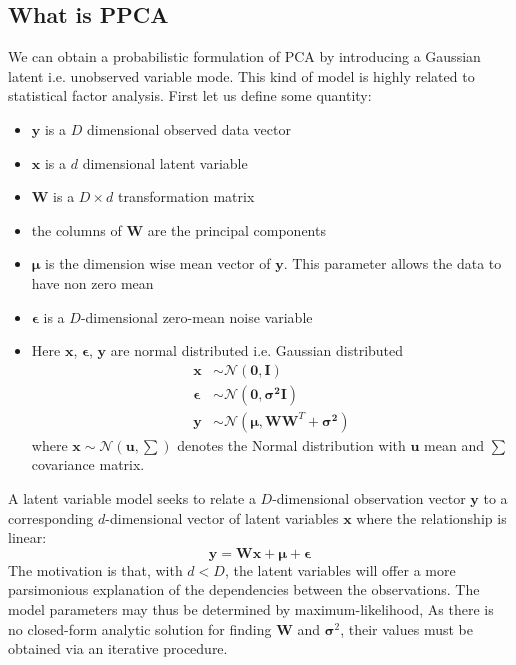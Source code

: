 \subsection{What is PPCA}
We can obtain a probabilistic formulation of PCA by introducing a Gaussian latent i.e. unobserved variable mode. This kind of model is highly related to statistical factor analysis. First let us define some quantity:
\begin{itemize}
\item $\pmb{y}$ is a $D$ dimensional observed data vector
\item $\pmb{x}$ is a $d$ dimensional latent variable
\item $\pmb{W}$ is a $D \times d$ transformation matrix
\item the columns of $\pmb{W}$ are the principal components
\item $\pmb{\mu}$ is the dimension wise mean vector of $\pmb{y}$. This parameter allows the data to have non zero mean
\item $\pmb{\epsilon}$ is a $D$-dimensional zero-mean  noise variable
\item Here $\pmb{x}$, $\pmb{\epsilon}$, $\pmb{y}$ are normal distributed i.e. Gaussian distributed
\begin{align*}
\pmb{x} &\sim \mathcal{N}(\pmb{0},\pmb{I})\\
\pmb{\epsilon} &\sim \mathcal{N}(\pmb{0},\pmb{\sigma^2I})\\
\pmb{y} &\sim \mathcal{N}(\pmb{\mu},\pmb{WW}^T+\pmb{\sigma^2})
\end{align*}
where $\pmb{x} \sim \mathcal{N}(\pmb{u},\sum)$ denotes the Normal distribution with $\pmb{u}$ mean and $\sum$ covariance matrix.
\end{itemize}
A latent variable model seeks to relate a $D$-dimensional observation vector $\pmb{y}$ to a corresponding $d$-dimensional vector of latent variables $\pmb{x}$ where the relationship is linear:
\begin{equation}
\pmb{y} = \pmb{Wx}+ \pmb{\mu} + \pmb{\epsilon}
\label{PPCA:eq1}
\end{equation}
The motivation is that, with $d < D $, the latent variables will offer a more parsimonious explanation of the dependencies between the observations. The model parameters may thus be determined by maximum-likelihood, As there is no closed-form analytic solution for finding $\pmb{W}$ and $\pmb{\sigma}^2$, their values must be obtained via an iterative procedure.

